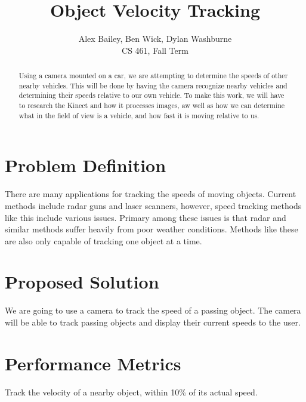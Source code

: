 \documentclass[letterpaper,10pt,onecolumn,draftclsnofoot]{IEEEtran}
\title{Object Velocity Tracking}
\author{Alex Bailey, Ben Wick, Dylan Washburne\\CS 461, Fall Term}
\begin{document}
\begin{titlepage}

\maketitle

\begin{abstract}
Using a camera mounted on a car, we are attempting to determine the speeds of other nearby vehicles.  This will be done by having the camera recognize nearby vehicles and determining their speeds relative to our own vehicle. To make this work, we will have to research the Kinect and how it processes images, aw well as how we can determine what in the field of view is a vehicle, and how fast it is moving relative to us.
\end{abstract}

\end{titlepage}

\section{Problem Definition}

There are many applications for tracking the speeds of moving objects.
Current methods include radar guns and laser scanners, however, speed tracking methods like this include various issues.
Primary among these issues is that radar and similar methods suffer heavily from poor weather conditions.
Methods like these are also only capable of tracking one object at a time.


\section{Proposed Solution}

We are going to use a camera to track the speed of a passing object.
The camera will be able to track passing objects and display their current speeds to the user.

\section{Performance Metrics}

Track the velocity of a nearby object, within 10\% of its actual speed.



\end{document}
